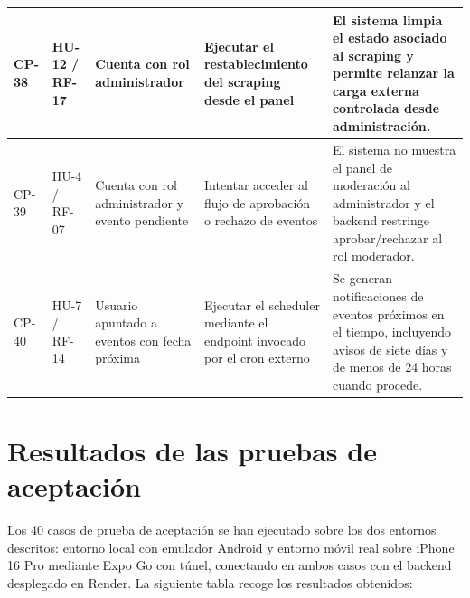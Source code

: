 \begin{longtable}{|L{1.3cm}|L{1.6cm}|L{3cm}|L{3.8cm}|L{4.3cm}|}
\hline
{}\label{cp:38}CP-38 & HU-12 / RF-17 & Cuenta con rol administrador & Ejecutar el restablecimiento del scraping desde el panel & El sistema limpia el estado asociado al scraping y permite relanzar la carga externa controlada desde administración. \\
\hline
{}\label{cp:39}CP-39 & HU-4 / RF-07 & Cuenta con rol administrador y evento pendiente & Intentar acceder al flujo de aprobación o rechazo de eventos & El sistema no muestra el panel de moderación al administrador y el backend restringe aprobar/rechazar al rol moderador. \\
\hline
{}\label{cp:40}CP-40 & HU-7 / RF-14 & Usuario apuntado a eventos con fecha próxima & Ejecutar el scheduler mediante el endpoint invocado por el cron externo & Se generan notificaciones de eventos próximos en el tiempo, incluyendo avisos de siete días y de menos de 24 horas cuando procede. \\
\hline
\end{longtable}

\section{Resultados de las pruebas de aceptación}

Los 40 casos de prueba de aceptación se han ejecutado sobre los dos entornos descritos: entorno local con emulador Android y entorno móvil real sobre iPhone 16 Pro mediante Expo Go con túnel, conectando en ambos casos con el backend desplegado en Render. La siguiente tabla recoge los resultados obtenidos:

